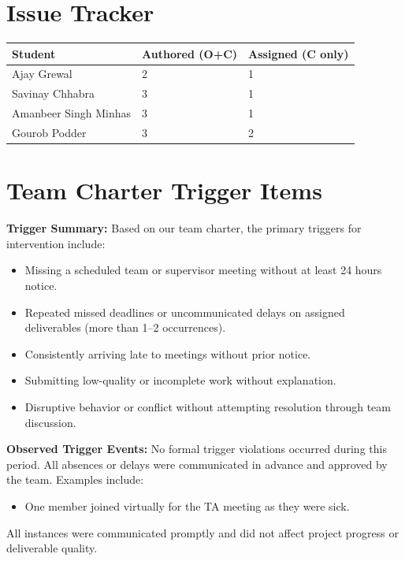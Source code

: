 \documentclass{article}
\begin{document}
\section{Issue Tracker}

\begin{table}[H]
\centering
\begin{tabular}{lll}
\toprule
\textbf{Student} & \textbf{Authored (O+C)} & \textbf{Assigned (C only)}\\
\midrule
Ajay Grewal & 2 & 1 \\
Savinay Chhabra & 3 & 1 \\
Amanbeer Singh Minhas & 3 & 1 \\
Gourob Podder & 3 & 2 \\
\bottomrule
\end{tabular}
\end{table}

\section{Team Charter Trigger Items}

\textbf{Trigger Summary:} Based on our team charter, the primary triggers
for intervention include:
\begin{itemize}
  \item Missing a scheduled team or supervisor meeting without at least
        24 hours notice.
  \item Repeated missed deadlines or uncommunicated delays on assigned
        deliverables (more than 1--2 occurrences).
  \item Consistently arriving late to meetings without prior notice.
  \item Submitting low-quality or incomplete work without explanation.
  \item Disruptive behavior or conflict without attempting resolution
        through team discussion.
\end{itemize}

\noindent\textbf{Observed Trigger Events:} No formal trigger violations occurred
during this period. All absences or delays were communicated in advance and
approved by the team. Examples include:
\begin{itemize}
  \item One member joined virtually for the TA meeting as they were sick.
\end{itemize}

All instances were communicated promptly and did not affect project progress
or deliverable quality.
\end{document}
